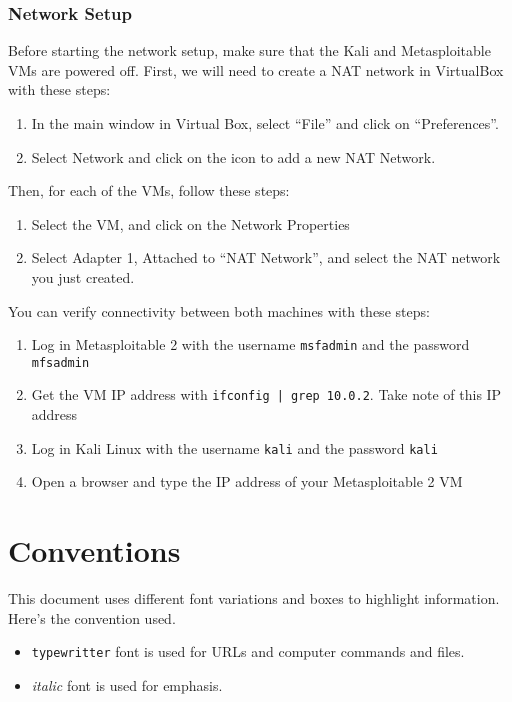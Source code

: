 \subsubsection*{Network Setup}

Before starting the network setup, make sure that the Kali and Metasploitable VMs are powered off. First, we will need to create a NAT network in VirtualBox with these steps: 

\begin{enumerate}
    \item In the main window in Virtual Box, select ``File'' and click on ``Preferences''.
    \item Select Network and click on the icon to add a new NAT Network.
\end{enumerate}

Then, for each of the VMs, follow these steps:

\begin{enumerate}
    \item Select the VM, and click on the Network Properties
    \item Select Adapter 1, Attached to ``NAT Network'', and select the NAT network you just created.
\end{enumerate}

You can verify connectivity between both machines with these steps:

\begin{enumerate}
    \item Log in Metasploitable 2 with the username \texttt{msfadmin} and the password \texttt{mfsadmin} 
    \item Get the VM IP address with \texttt{ifconfig | grep 10.0.2}. Take note of this IP address
    \item Log in Kali Linux with the username \texttt{kali} and the password \texttt{kali}
    \item Open a browser and type the IP address of your Metasploitable 2 VM
\end{enumerate}

\section*{Conventions}

This document uses different font variations and boxes to highlight information. Here's the convention used.

\begin{itemize}
    \item[] \texttt{typewritter} font is used for URLs and computer commands and files.
    \item[] \textit{italic} font is used for emphasis. 
\end{itemize}

